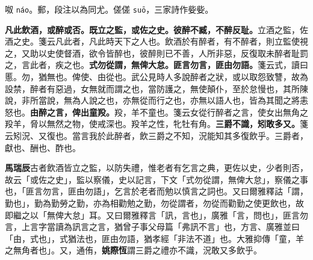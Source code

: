 \begin{quoting}呶 \texttt{náo}。郵，段注以為同尤。傞傞 \texttt{suō}，三家詩作姕姕。\end{quoting}

\textbf{凡此飲酒，或醉或否。既立之監，或佐之史。彼醉不臧，不醉反耻。}{\footnotesize 立酒之監，佐酒之史。箋云凡此者，凡此時天下之人也。飲酒於有醉者，有不醉者，則立監使視之，又助以史使督酒，欲令皆醉也，彼醉則已不善，人所非惡，反復取未醉者耻罰之，言此者，疾之也。}\textbf{式勿從謂，無俾大怠。匪言勿言，匪由勿語。}{\footnotesize 箋云式，讀曰慝。勿，猶無也。俾使、由從也。武公見時人多說醉者之狀，或以取怨致讐，故為設禁，醉者有惡過，女無就而謂之也，當防護之，無使顛仆，至於怠慢也，其所陳說，非所當說，無為人說之也，亦無從而行之也，亦無以語人也，皆為其聞之將恚怒也。}\textbf{由醉之言，俾出童羖。}{\footnotesize 羖，羊不童也。箋云女從行醉者之言，使女出無角之羖羊，脅以無然之物，使戒深也。羖羊之性，牝牡有角。}\textbf{三爵不識，矧敢多又。}{\footnotesize 箋云矧況、又復也。當言我於此醉者，飲三爵之不知，況能知其多復飲乎。三爵者，獻也、酬也、酢也。}

\begin{quoting}\textbf{馬瑞辰}古者飲酒皆立之監，以防失禮，惟老者有乞言之典，更佐以史，少者則否，故云「或佐之史」，監以察儀，史以記言，下文「式勿從謂，無俾大怠」，察儀之事也，「匪言勿言，匪由勿語」，乞言於老者而勉以慎言之詞也。又曰爾雅釋詁「謂，勤也」，勤為勤勞之勤，亦為相勸勉之勤，勿從謂者，勿從而勸勤之使更飲也，故即繼之以「無俾大怠」耳。又曰爾雅釋言「訊，言也」，廣雅「言，問也」，匪言勿言，上言字當讀為訊言之言，猶曾子事父母篇「弗訊不言」也，方言、廣雅並曰「由，式也」，式猶法也，匪由勿語，猶孝經「非法不道」也。大雅抑傳「童，羊之無角者也」。又，通侑，\textbf{姚際恆}謂三爵之禮亦不識，況敢又多飲乎。\end{quoting}

